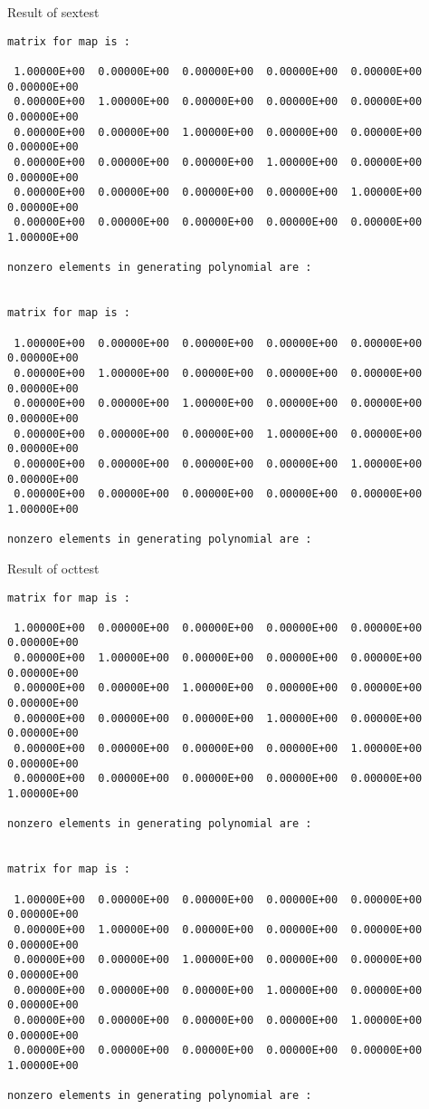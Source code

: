 Result of sextest
\begin{footnotesize}
\begin{verbatim}
matrix for map is :

 1.00000E+00  0.00000E+00  0.00000E+00  0.00000E+00  0.00000E+00  0.00000E+00
 0.00000E+00  1.00000E+00  0.00000E+00  0.00000E+00  0.00000E+00  0.00000E+00
 0.00000E+00  0.00000E+00  1.00000E+00  0.00000E+00  0.00000E+00  0.00000E+00
 0.00000E+00  0.00000E+00  0.00000E+00  1.00000E+00  0.00000E+00  0.00000E+00
 0.00000E+00  0.00000E+00  0.00000E+00  0.00000E+00  1.00000E+00  0.00000E+00
 0.00000E+00  0.00000E+00  0.00000E+00  0.00000E+00  0.00000E+00  1.00000E+00

nonzero elements in generating polynomial are :


matrix for map is :

 1.00000E+00  0.00000E+00  0.00000E+00  0.00000E+00  0.00000E+00  0.00000E+00
 0.00000E+00  1.00000E+00  0.00000E+00  0.00000E+00  0.00000E+00  0.00000E+00
 0.00000E+00  0.00000E+00  1.00000E+00  0.00000E+00  0.00000E+00  0.00000E+00
 0.00000E+00  0.00000E+00  0.00000E+00  1.00000E+00  0.00000E+00  0.00000E+00
 0.00000E+00  0.00000E+00  0.00000E+00  0.00000E+00  1.00000E+00  0.00000E+00
 0.00000E+00  0.00000E+00  0.00000E+00  0.00000E+00  0.00000E+00  1.00000E+00

nonzero elements in generating polynomial are :

\end{verbatim}
\end{footnotesize}
Result of octtest
\begin{footnotesize}
\begin{verbatim}
matrix for map is :

 1.00000E+00  0.00000E+00  0.00000E+00  0.00000E+00  0.00000E+00  0.00000E+00
 0.00000E+00  1.00000E+00  0.00000E+00  0.00000E+00  0.00000E+00  0.00000E+00
 0.00000E+00  0.00000E+00  1.00000E+00  0.00000E+00  0.00000E+00  0.00000E+00
 0.00000E+00  0.00000E+00  0.00000E+00  1.00000E+00  0.00000E+00  0.00000E+00
 0.00000E+00  0.00000E+00  0.00000E+00  0.00000E+00  1.00000E+00  0.00000E+00
 0.00000E+00  0.00000E+00  0.00000E+00  0.00000E+00  0.00000E+00  1.00000E+00

nonzero elements in generating polynomial are :


matrix for map is :

 1.00000E+00  0.00000E+00  0.00000E+00  0.00000E+00  0.00000E+00  0.00000E+00
 0.00000E+00  1.00000E+00  0.00000E+00  0.00000E+00  0.00000E+00  0.00000E+00
 0.00000E+00  0.00000E+00  1.00000E+00  0.00000E+00  0.00000E+00  0.00000E+00
 0.00000E+00  0.00000E+00  0.00000E+00  1.00000E+00  0.00000E+00  0.00000E+00
 0.00000E+00  0.00000E+00  0.00000E+00  0.00000E+00  1.00000E+00  0.00000E+00
 0.00000E+00  0.00000E+00  0.00000E+00  0.00000E+00  0.00000E+00  1.00000E+00

nonzero elements in generating polynomial are :
\end{verbatim}
\end{footnotesize}

